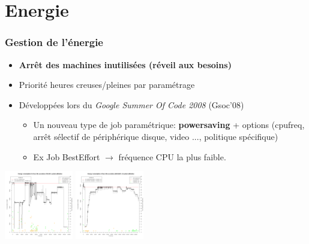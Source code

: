 \documentclass{beamer}
\begin{document}
% 
%
%
%
% 


\section{Energie}

\begin{frame}
  \frametitle{Gestion de l'énergie} \hypertarget{energy}{}
  \begin{itemize}
    \item {\bf Arrêt des machines inutilisées (réveil aux besoins)}
    \item Priorité heures creuses/pleines par paramétrage
		\item Développées lors du {\em Google Summer Of Code 2008} (Gsoc'08)
    \begin{itemize}
       \item Un nouveau type de job paramétrique:  {\bf powersaving} + options (cpufreq, arrêt sélectif de périphérique disque, video ..., politique spécifique)
       \item Ex Job BestEffort $\rightarrow$ fréquence CPU la plus faible.
    \end{itemize}
  \end{itemize}
  \begin{center}
    \includegraphics[width=3cm]{img/energy50.png}
    \includegraphics[width=3cm]{img/energy90.png}
    \\\hyperlink{energy-appendix}{}
  \end{center}
\end{frame}
\end{document}
